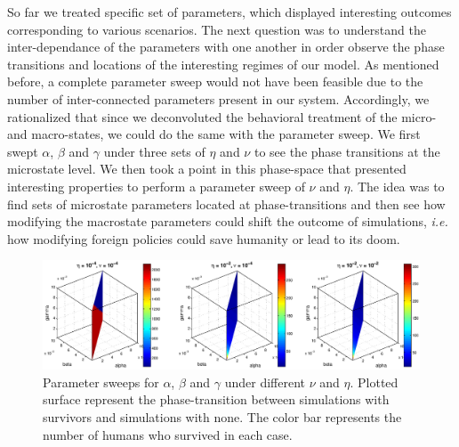 \documentclass[11pt]{article} %
\begin{document}
So far we treated specific set of parameters, which displayed interesting outcomes corresponding to various scenarios. The next question was to understand the inter-dependance of the parameters with one another in order observe the phase transitions and locations of the interesting regimes of our model. As mentioned before, a complete parameter sweep would not have been feasible due to the number of inter-connected parameters present in our system. Accordingly, we rationalized that since we deconvoluted the behavioral treatment of the micro- and macro-states, we could do the same with the parameter sweep. We first swept $\alpha$, $\beta$ and $\gamma$ under three sets of $\eta$ and $\nu$ to see the phase transitions at the microstate level. We then took a point in this phase-space that presented interesting properties to perform a parameter sweep of $\nu$ and $\eta$. The idea was to find sets of microstate parameters located at phase-transitions and then see how modifying the macrostate parameters could shift the outcome of simulations, \textit{i.e.} how modifying foreign policies could save humanity or lead to its doom.
\begin{figure}[h!]
\centerline{
\includegraphics[scale=0.45]{../images/Matlab_figures/a-b-g-sweep.eps}}
\caption{Parameter sweeps for $\alpha$, $\beta$ and $\gamma$ under different $\nu$ and $\eta$. Plotted surface represent the phase-transition between simulations with survivors and simulations with none. The color bar represents the number of humans who survived in each case.  \label{a-b-g} }
\end{figure}
\end{document}

